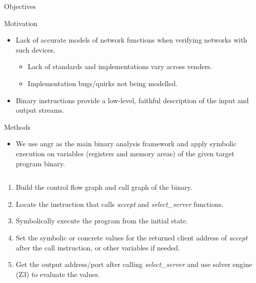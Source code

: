 \documentclass[final,hyperref={pdfpagelabels=false}]{beamer}
\begin{document}
\begin{frame}[t,fragile]
\begin{columns}[t]
\begin{column}{.465\textwidth}
\begin{block}{Objectives}
\end{block}


\begin{block}{Motivation}

\begin{itemize}
    \item Lack of accurate models of network functions when verifying networks
        with such devices.
        \begin{itemize}
            \item Lack of standards and implementations vary across venders.
            \item Implementation bugs/quirks not being modelled.
        \end{itemize}
    \item Binary instructions provide a low-level, faithful description of the
        input and output streams.
\end{itemize}

\end{block}


\begin{block}{Methods}

\begin{itemize}
    \item We use angr as the main binary analysis framework and apply symbolic
        execution on variables (registers and memory areas) of the given target
        program binary.
\end{itemize}

\begin{columns}

\begin{column}{.43\textwidth}
\begin{enumerate}
    \item Build the control flow graph and call graph of the binary.
    \item Locate the instruction that calls \emph{accept} and
        \emph{select\_server} functions.
    \item Symbolically execute the program from the initial state.
    \item Set the symbolic or concrete values for the returned client address of
        \emph{accept} after the call instruction, or other variables if needed.
    \item Get the output address/port after calling \emph{select\_server}
        and use solver engine (Z3) to evaluate the values.
\end{enumerate}
\end{column}


\end{columns}
\end{block}
\end{column}
\end{columns}
\end{frame}
\end{document}
